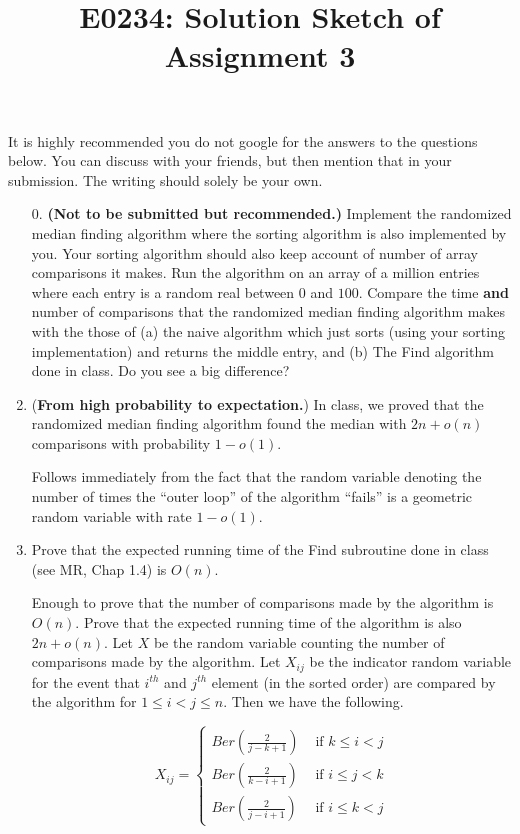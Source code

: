 \documentclass[11pt]{article}
\begin{document}
\title{E0234: Solution Sketch of Assignment 3}
\author{}
\maketitle
It is highly recommended you do not google for the answers to the questions below. You can discuss with your friends, but then mention that in your submission.
The writing should solely be your own.

\begin{enumerate}
\item[0.] {\bf (Not to be submitted but recommended.)} Implement the randomized median finding algorithm where the sorting algorithm is also implemented by you. 
Your sorting algorithm should also keep account of number of array comparisons it makes. Run the algorithm 
on an array of a million entries where each entry is a random real between $0$ and $100$. 
Compare the time {\bf and} number of comparisons that the randomized median finding algorithm 
makes with the those of (a) the naive algorithm which just sorts (using your sorting implementation) and returns the middle entry, and (b) The Find algorithm done in class.
Do you see a big difference?

\item ({\bf From high probability to expectation.}) In class, we proved that the randomized median finding algorithm found the median with $2n + o(n)$ comparisons with probability $1 - o(1)$.

\Sol Follows immediately from the fact that the random variable denoting the number of times the ``outer loop'' of the algorithm ``fails'' is a geometric random variable with rate $1 - o(1)$.

\item Prove that the expected running time of the Find subroutine done in class (see MR, Chap 1.4) is $O(n)$.

\Sol Enough to prove that the number of comparisons made by the algorithm is $O(n)$. 
Prove that the expected running time of the algorithm is also $2n + o(n)$. Let $X$ be the random variable counting the number of comparisons made by the algorithm. Let $X_{ij}$ be the indicator random variable for the event that $i^{th}$ and $j^{th}$ element (in the sorted order) are compared by the algorithm for $1\le i< j\le n$. Then we have the following.

$$
X_{ij}=
\begin{cases}
Ber(\frac{2}{j-k+1}) & \text{ if } k\le i<j\\
Ber(\frac{2}{k-i+1}) & \text{ if } i\le j <k\\
Ber(\frac{2}{j-i+1}) & \text{ if } i\le k <j
\end{cases}
$$


\end{enumerate}
\end{document}
